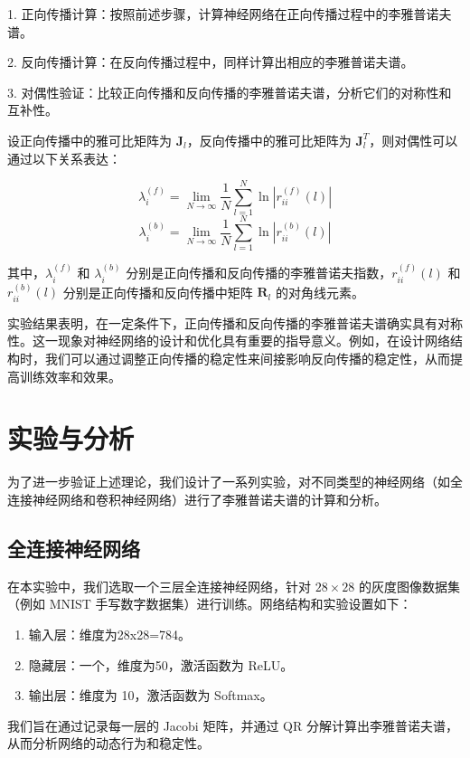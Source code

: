 1. 正向传播计算：按照前述步骤，计算神经网络在正向传播过程中的李雅普诺夫谱。
   
2. 反向传播计算：在反向传播过程中，同样计算出相应的李雅普诺夫谱。

3. 对偶性验证：比较正向传播和反向传播的李雅普诺夫谱，分析它们的对称性和互补性。

设正向传播中的雅可比矩阵为 \(\mathbf{J}_l\)，反向传播中的雅可比矩阵为 \(\mathbf{J}_l^T\)，则对偶性可以通过以下关系表达：

\[ \lambda_i^{(f)} = \lim_{N \to \infty} \frac{1}{N} \sum_{l=1}^N \ln |r_{ii}^{(f)}(l)| \]
\[ \lambda_i^{(b)} = \lim_{N \to \infty} \frac{1}{N} \sum_{l=1}^N \ln |r_{ii}^{(b)}(l)| \]

其中，\(\lambda_i^{(f)}\) 和 \(\lambda_i^{(b)}\) 分别是正向传播和反向传播的李雅普诺夫指数，\(r_{ii}^{(f)}(l)\) 和 \(r_{ii}^{(b)}(l)\) 分别是正向传播和反向传播中矩阵 \(\mathbf{R}_l\) 的对角线元素。

实验结果表明，在一定条件下，正向传播和反向传播的李雅普诺夫谱确实具有对称性。这一现象对神经网络的设计和优化具有重要的指导意义。例如，在设计网络结构时，我们可以通过调整正向传播的稳定性来间接影响反向传播的稳定性，从而提高训练效率和效果。

\section{实验与分析}

为了进一步验证上述理论，我们设计了一系列实验，对不同类型的神经网络（如全连接神经网络和卷积神经网络）进行了李雅普诺夫谱的计算和分析。

\subsection{全连接神经网络}

在本实验中，我们选取一个三层全连接神经网络，针对 $28\times 28$ 的灰度图像数据集（例如 MNIST 手写数字数据集）进行训练。网络结构和实验设置如下：

\begin{enumerate}
  \item 输入层：维度为28x28=784。
  \item 隐藏层：一个，维度为50，激活函数为 ReLU。
  \item 输出层：维度为 10，激活函数为 Softmax。
\end{enumerate}

我们旨在通过记录每一层的 Jacobi 矩阵，并通过 QR 分解计算出李雅普诺夫谱，从而分析网络的动态行为和稳定性。

